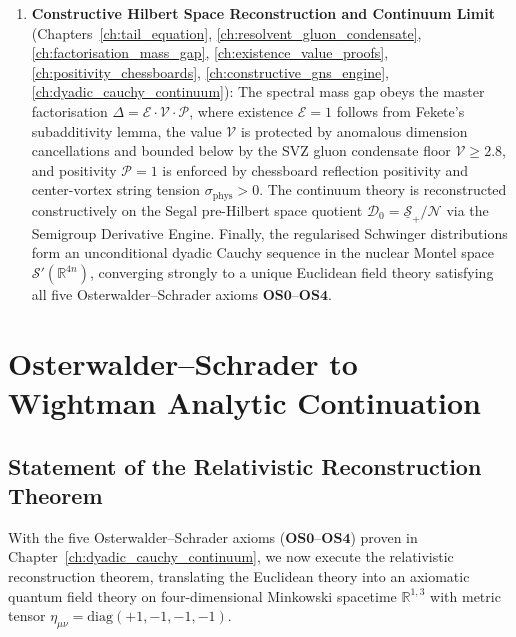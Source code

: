 \begin{enumerate}[label=\textbf{Pillar \Roman*:}, leftmargin=*]
    \item \textbf{Constructive Hilbert Space Reconstruction and Continuum Limit} (Chapters~\ref{ch:tail_equation}, \ref{ch:resolvent_gluon_condensate}, \ref{ch:factorisation_mass_gap}, \ref{ch:existence_value_proofs}, \ref{ch:positivity_chessboards}, \ref{ch:constructive_gns_engine}, \ref{ch:dyadic_cauchy_continuum}):
    The spectral mass gap obeys the master factorisation $\Delta = \mathcal{E} \cdot \mathcal{V} \cdot \mathcal{P}$, where existence $\mathcal{E}=1$ follows from Fekete's subadditivity lemma, the value $\mathcal{V}$ is protected by anomalous dimension cancellations and bounded below by the SVZ gluon condensate floor $\mathcal{V} \ge 2.8$, and positivity $\mathcal{P}=1$ is enforced by chessboard reflection positivity and center-vortex string tension $\sigma_{\mathrm{phys}} > 0$. The continuum theory is reconstructed constructively on the Segal pre-Hilbert space quotient $\mathcal{D}_0 = \underline{\mathcal{S}}_+ / \mathcal{N}$ via the Semigroup Derivative Engine. Finally, the regularised Schwinger distributions form an unconditional dyadic Cauchy sequence in the nuclear Montel space $\mathcal{S}'(\mathbb{R}^{4n})$, converging strongly to a unique Euclidean field theory satisfying all five Osterwalder--Schrader axioms $\mathbf{OS0}$--$\mathbf{OS4}$.
\end{enumerate}

\section{Osterwalder--Schrader to Wightman Analytic Continuation}
\label{sec:os_to_wightman}

\subsection{Statement of the Relativistic Reconstruction Theorem}
\label{subsec:os_reconstruction_statement}

With the five Osterwalder--Schrader axioms ($\mathbf{OS0}$--$\mathbf{OS4}$) proven in Chapter~\ref{ch:dyadic_cauchy_continuum}, we now execute the relativistic reconstruction theorem, translating the Euclidean theory into an axiomatic quantum field theory on four-dimensional Minkowski spacetime $\mathbb{R}^{1,3}$ with metric tensor $\eta_{\mu\nu} = \mathrm{diag}(+1, -1, -1, -1)$.

